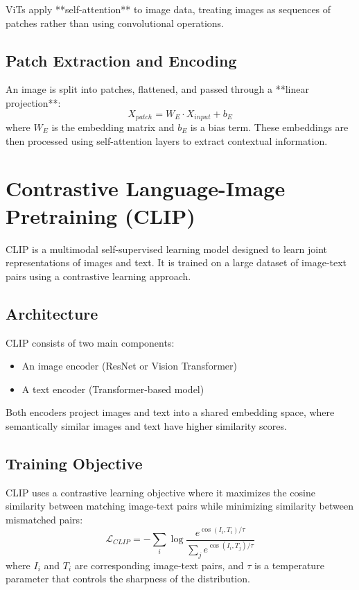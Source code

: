 \documentclass[
]{book}
\begin{document}
ViTs apply **self-attention** to image data, treating images as
sequences of patches rather than using convolutional operations.

\section{Patch Extraction and Encoding}\label{patch-extraction-and-encoding-1}

An image is split into patches, flattened, and passed through a
**linear projection**: \[X_{patch} = W_E \cdot X_{input} + b_E\]
where \(W_E\) is the embedding matrix and \(b_E\) is a bias term. These
embeddings are then processed using self-attention layers to extract
contextual information.

\chapter{Contrastive Language-Image Pretraining (CLIP)}\label{contrastive-language-image-pretraining-clip-1}

CLIP is a multimodal self-supervised learning model designed to learn
joint representations of images and text. It is trained on a large
dataset of image-text pairs using a contrastive learning approach.

\section{Architecture}\label{architecture-1}

CLIP consists of two main components:

\begin{itemize}
\item
  An image encoder (ResNet or Vision Transformer)
\item
  A text encoder (Transformer-based model)
\end{itemize}

Both encoders project images and text into a shared embedding space,
where semantically similar images and text have higher similarity
scores.

\section{Training Objective}\label{training-objective-1}

CLIP uses a contrastive learning objective where it maximizes the cosine
similarity between matching image-text pairs while minimizing similarity
between mismatched pairs:
\[\mathcal{L}_{CLIP} = - \sum_{i} \log \frac{e^{\cos(I_i, T_i)/\tau}}{\sum_j e^{\cos(I_i, T_j)/\tau}}\]
where \(I_i\) and \(T_i\) are corresponding image-text pairs, and \(\tau\) is
a temperature parameter that controls the sharpness of the distribution.
\end{document}

